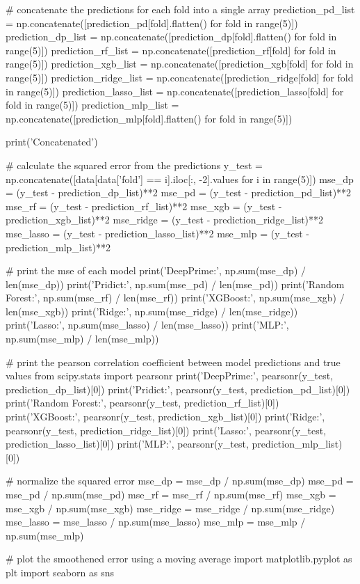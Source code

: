 # concatenate the predictions for each fold into a single array
prediction_pd_list = np.concatenate([prediction_pd[fold].flatten() for fold in range(5)])
prediction_dp_list = np.concatenate([prediction_dp[fold].flatten() for fold in range(5)])
prediction_rf_list = np.concatenate([prediction_rf[fold] for fold in range(5)])
prediction_xgb_list = np.concatenate([prediction_xgb[fold] for fold in range(5)])
prediction_ridge_list = np.concatenate([prediction_ridge[fold] for fold in range(5)])
prediction_lasso_list = np.concatenate([prediction_lasso[fold] for fold in range(5)])
prediction_mlp_list = np.concatenate([prediction_mlp[fold].flatten() for fold in range(5)])

print('Concatenated')

# calculate the squared error from the predictions
y_test = np.concatenate([data[data['fold'] == i].iloc[:, -2].values for i in range(5)])
mse_dp = (y_test - prediction_dp_list)**2
mse_pd = (y_test - prediction_pd_list)**2
mse_rf = (y_test - prediction_rf_list)**2
mse_xgb = (y_test - prediction_xgb_list)**2
mse_ridge = (y_test - prediction_ridge_list)**2
mse_lasso = (y_test - prediction_lasso_list)**2
mse_mlp = (y_test - prediction_mlp_list)**2

# print the mse of each model
print('DeepPrime:', np.sum(mse_dp) / len(mse_dp))
print('Pridict:', np.sum(mse_pd) / len(mse_pd))
print('Random Forest:', np.sum(mse_rf) / len(mse_rf))
print('XGBoost:', np.sum(mse_xgb) / len(mse_xgb))
print('Ridge:', np.sum(mse_ridge) / len(mse_ridge))
print('Lasso:', np.sum(mse_lasso) / len(mse_lasso))
print('MLP:', np.sum(mse_mlp) / len(mse_mlp))

# print the pearson correlation coefficient between model predictions and true values
from scipy.stats import pearsonr
print('DeepPrime:', pearsonr(y_test, prediction_dp_list)[0])
print('Pridict:', pearsonr(y_test, prediction_pd_list)[0])
print('Random Forest:', pearsonr(y_test, prediction_rf_list)[0])
print('XGBoost:', pearsonr(y_test, prediction_xgb_list)[0])
print('Ridge:', pearsonr(y_test, prediction_ridge_list)[0])
print('Lasso:', pearsonr(y_test, prediction_lasso_list)[0])
print('MLP:', pearsonr(y_test, prediction_mlp_list)[0])

# normalize the squared error
mse_dp = mse_dp / np.sum(mse_dp)
mse_pd = mse_pd / np.sum(mse_pd)
mse_rf = mse_rf / np.sum(mse_rf)
mse_xgb = mse_xgb / np.sum(mse_xgb)
mse_ridge = mse_ridge / np.sum(mse_ridge)
mse_lasso = mse_lasso / np.sum(mse_lasso)
mse_mlp = mse_mlp / np.sum(mse_mlp)


# plot the smoothened error using a moving average
import matplotlib.pyplot as plt
import seaborn as sns

